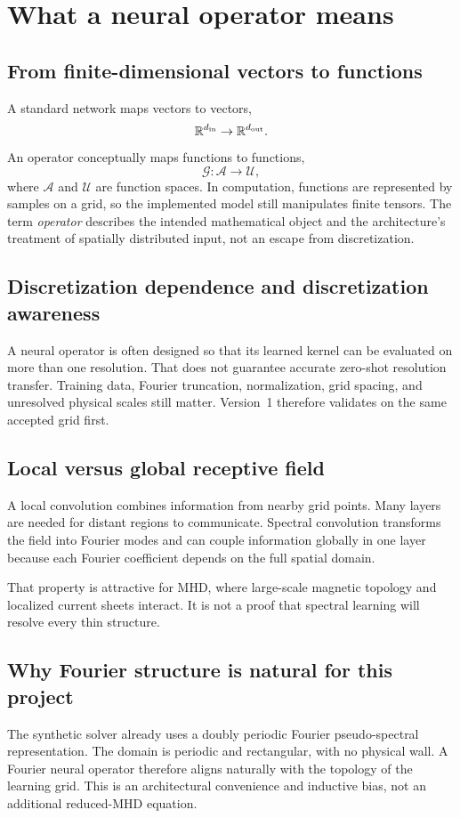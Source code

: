 \documentclass[11pt]{article}
\begin{document}
\section{What a neural operator means}
\label{sec:operator_concept}

\subsection{From finite-dimensional vectors to functions}
A standard network maps vectors to vectors,
\[
\mathbb{R}^{d_{\rm in}}\to\mathbb{R}^{d_{\rm out}}.
\]
An operator conceptually maps functions to functions,
\[
\mathcal{G}:\mathcal{A}\to\mathcal{U},
\]
where $\mathcal{A}$ and $\mathcal{U}$ are function spaces. In computation, functions are represented by samples on a grid, so the implemented model still manipulates finite tensors. The term \emph{operator} describes the intended mathematical object and the architecture's treatment of spatially distributed input, not an escape from discretization.

\subsection{Discretization dependence and discretization awareness}
A neural operator is often designed so that its learned kernel can be evaluated on more than one resolution. That does not guarantee accurate zero-shot resolution transfer. Training data, Fourier truncation, normalization, grid spacing, and unresolved physical scales still matter. Version~1 therefore validates on the same accepted grid first.

\subsection{Local versus global receptive field}
A local convolution combines information from nearby grid points. Many layers are needed for distant regions to communicate. Spectral convolution transforms the field into Fourier modes and can couple information globally in one layer because each Fourier coefficient depends on the full spatial domain.

That property is attractive for MHD, where large-scale magnetic topology and localized current sheets interact. It is not a proof that spectral learning will resolve every thin structure.

\subsection{Why Fourier structure is natural for this project}
The synthetic solver already uses a doubly periodic Fourier pseudo-spectral representation. The domain is periodic and rectangular, with no physical wall. A Fourier neural operator therefore aligns naturally with the topology of the learning grid. This is an architectural convenience and inductive bias, not an additional reduced-MHD equation.
\end{document}
